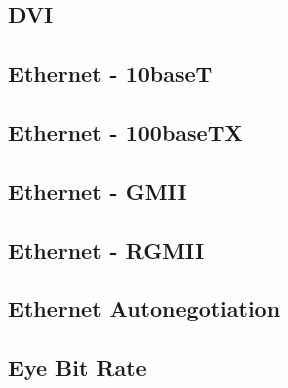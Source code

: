 \pagebreak
\subsection{DVI}
\label{filter:dvi}

\pagebreak
\subsection{Ethernet - 10baseT}

\pagebreak
\subsection{Ethernet - 100baseTX}

\pagebreak
\subsection{Ethernet - GMII}

\pagebreak
\subsection{Ethernet - RGMII}

\pagebreak
\subsection{Ethernet Autonegotiation}

\pagebreak
\subsection{Eye Bit Rate}

\pagebreak
